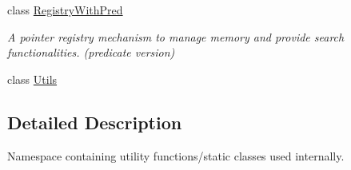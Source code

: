 \begin{DoxyCompactItemize}
class \hyperlink{classel_1_1base_1_1utils_1_1RegistryWithPred}{Registry\-With\-Pred}
\begin{DoxyCompactList}\small\item\em A pointer registry mechanism to manage memory and provide search functionalities. (predicate version) \end{DoxyCompactList}\item 
class \hyperlink{classel_1_1base_1_1utils_1_1Utils}{Utils}
\end{DoxyCompactItemize}


\subsection{Detailed Description}
Namespace containing utility functions/static classes used internally. 